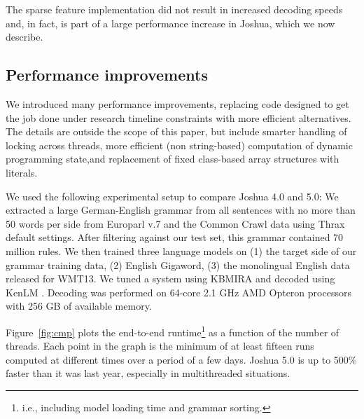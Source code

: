 \documentclass[11pt]{article}
\begin{document}
The sparse feature implementation did not result in increased decoding
speeds and, in fact, is part of a large performance increase in
Joshua, which we now describe.

\subsection{Performance improvements}

We introduced many performance improvements, replacing code designed
to get the job done under research timeline constraints with more
efficient alternatives. The details are outside the scope of this
paper, but include smarter handling of locking across threads, more
efficient (non string-based) computation of dynamic programming state,and
replacement of fixed class-based array structures with literals.

We used the following experimental setup to compare Joshua 4.0 and
5.0: We extracted a large German-English grammar from all sentences
with no more than 50 words per side from Europarl v.7 and the Common
Crawl data using Thrax default settings.  After filtering against our
test set, this grammar contained 70 million rules.  We then trained
three language models on (1) the target side of our grammar training
data, (2) English Gigaword, (3) the monolingual English data released
for WMT13. We tuned a system using KBMIRA and decoded using KenLM
\cite{KenLM}.  Decoding was performed on 64-core 2.1 GHz AMD Opteron
processors with 256 GB of available memory.

Figure~\ref{fig:cmp} plots the end-to-end runtime\footnote{i.e.,
  including model loading time and grammar sorting.} as a function of
the number of threads.  Each point in the graph is the minimum of at
least fifteen runs computed at different times over a period of a few
days.  Joshua 5.0 is up to 500\% faster than it was last year,
especially in multithreaded situations.
\end{document}

